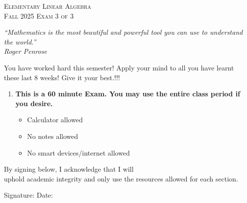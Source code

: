 \documentclass[12pt]{article}%
\begin{document}
\newcommand{\HRule}{\rule{\linewidth}{0.5mm}}

\begin{minipage}{0.8\textwidth}
\begin{flushright}
\centering
\textsc{\small Elementary Linear Algebra}\\[0.1cm] 
\textsc{\small Fall 2025 Exam 3 of 3
}\\[0.1cm] 
\end{flushright}
\end{minipage}

\vspace{1cm}
\begin{center}
    \textit{“Mathematics is the most beautiful and powerful tool you can use to understand the world.”}
\\
\textit{Roger Penrose}

\end{center}

\begin{center}
    You have worked hard this semester! Apply your mind to all you have learnt these last 8 weeks! Give it your best.!!!
\end{center}
\vspace{2cm}
\begin{enumerate}
    \item[1)] \textbf{This is a 60 minute Exam. You may use the entire class period if you desire.}
    \begin{itemize}
        \item[a)] Calculator allowed

        \item[b)] No notes allowed
        
        \item[c)] No smart devices/internet allowed
    \end{itemize}
    
\end{enumerate}
\vspace{1cm}
By signing below, I \hrulefill \hspace{0.2cm} acknowledge that I will\\
uphold academic integrity and only use the resources allowed for each section.

\vspace{1cm}
Signature:\hrulefill \hspace{2cm} Date:\hrulefill

\vspace{0.5cm}
\end{document}
